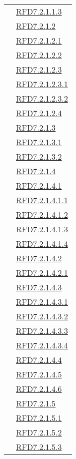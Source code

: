 \begin{longtable}{|>{\centering}m{5cm}|m{5cm}<{\centering}|}
& \hyperlink{RFD7.2.1.1.3}{RFD7.2.1.1.3}\\
& \hyperlink{RFD7.2.1.2}{RFD7.2.1.2}\\
& \hyperlink{RFD7.2.1.2.1}{RFD7.2.1.2.1}\\
& \hyperlink{RFD7.2.1.2.2}{RFD7.2.1.2.2}\\
& \hyperlink{RFD7.2.1.2.3}{RFD7.2.1.2.3}\\
& \hyperlink{RFD7.2.1.2.3.1}{RFD7.2.1.2.3.1}\\
& \hyperlink{RFD7.2.1.2.3.2}{RFD7.2.1.2.3.2}\\
& \hyperlink{RFD7.2.1.2.4}{RFD7.2.1.2.4}\\
& \hyperlink{RFD7.2.1.3}{RFD7.2.1.3}\\
& \hyperlink{RFD7.2.1.3.1}{RFD7.2.1.3.1}\\
& \hyperlink{RFD7.2.1.3.2}{RFD7.2.1.3.2}\\
& \hyperlink{RFD7.2.1.4}{RFD7.2.1.4}\\
& \hyperlink{RFD7.2.1.4.1}{RFD7.2.1.4.1}\\
& \hyperlink{RFD7.2.1.4.1.1}{RFD7.2.1.4.1.1}\\
& \hyperlink{RFD7.2.1.4.1.2}{RFD7.2.1.4.1.2}\\
& \hyperlink{RFD7.2.1.4.1.3}{RFD7.2.1.4.1.3}\\
& \hyperlink{RFD7.2.1.4.1.4}{RFD7.2.1.4.1.4}\\
& \hyperlink{RFD7.2.1.4.2}{RFD7.2.1.4.2}\\
& \hyperlink{RFD7.2.1.4.2.1}{RFD7.2.1.4.2.1}\\
& \hyperlink{RFD7.2.1.4.3}{RFD7.2.1.4.3}\\
& \hyperlink{RFD7.2.1.4.3.1}{RFD7.2.1.4.3.1}\\
& \hyperlink{RFD7.2.1.4.3.2}{RFD7.2.1.4.3.2}\\
& \hyperlink{RFD7.2.1.4.3.3}{RFD7.2.1.4.3.3}\\
& \hyperlink{RFD7.2.1.4.3.4}{RFD7.2.1.4.3.4}\\
& \hyperlink{RFD7.2.1.4.4}{RFD7.2.1.4.4}\\
& \hyperlink{RFD7.2.1.4.5}{RFD7.2.1.4.5}\\
& \hyperlink{RFD7.2.1.4.6}{RFD7.2.1.4.6}\\
& \hyperlink{RFD7.2.1.5}{RFD7.2.1.5}\\
& \hyperlink{RFD7.2.1.5.1}{RFD7.2.1.5.1}\\
& \hyperlink{RFD7.2.1.5.2}{RFD7.2.1.5.2}\\
& \hyperlink{RFD7.2.1.5.3}{RFD7.2.1.5.3}\\

\end{longtable}
